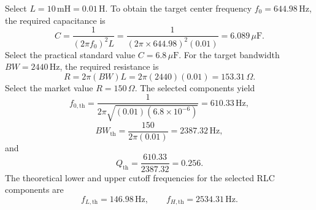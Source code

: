 \documentclass[12pt,a4paper]{article}
\begin{document}
Select $L=10\,\mathrm{mH}=0.01\,\mathrm{H}$. To obtain the target center frequency $f_0=644.98\,\mathrm{Hz}$, the required capacitance is
\begin{equation}
  C=\frac{1}{(2\pi f_0)^2L}
  =\frac{1}{(2\pi\times644.98)^2(0.01)}
  =6.089\,\mu\mathrm{F}.
  \label{eq:bs-c-calc}
\end{equation}
Select the practical standard value $C=6.8\,\mu\mathrm{F}$. For the target bandwidth $BW=2440\,\mathrm{Hz}$, the required resistance is
\begin{equation}
  R=2\pi(BW)L
  =2\pi(2440)(0.01)
  =153.31\,\Omega.
  \label{eq:bs-r-calc}
\end{equation}
Select the market value $R=150\,\Omega$. The selected components yield
\begin{equation}
  f_{0,\mathrm{th}}
  =\frac{1}{2\pi\sqrt{(0.01)(6.8\times10^{-6})}}
  =610.33\,\mathrm{Hz},
  \label{eq:bs-selected-f0}
\end{equation}
\begin{equation}
  BW_{\mathrm{th}}
  =\frac{150}{2\pi(0.01)}
  =2387.32\,\mathrm{Hz},
  \label{eq:bs-selected-bw}
\end{equation}
and
\begin{equation}
  Q_{\mathrm{th}}=\frac{610.33}{2387.32}=0.256.
  \label{eq:bs-selected-q}
\end{equation}
The theoretical lower and upper cutoff frequencies for the selected RLC components are
\begin{equation}
  f_{L,\mathrm{th}}=146.98\,\mathrm{Hz},
  \qquad f_{H,\mathrm{th}}=2534.31\,\mathrm{Hz}.
  \label{eq:bs-selected-cutoffs}
\end{equation}
\end{document}
